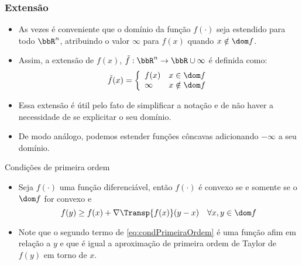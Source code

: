 \begin{frame}
  \frametitle{Extensão}
  \begin{itemize}
    \item As vezes é conveniente que o domínio da função $f(\cdot)$ seja estendido para todo $\bbR^n$, atribuindo o 
    valor $\infty$ para $f(x)$ quando $x \notin \dom f$.
    \item Assim, a extensão de $f(x)$, $\tilde{f}: \bbR^n \rightarrow \bbR \cup \infty$ é definida como:
    \begin{equation}
      \tilde{f}(x) = \left\{\begin{array}{ll}
        f(x) & x \in \dom f \\
        \infty & x \notin \dom f
      \end{array} \right.
    \end{equation}
    \item Essa extensão é útil pelo fato de simplificar a notação e de não haver a necessidade de se explicitar o seu 
    domínio.
    \item De modo análogo, podemos estender funções côncavas adicionando $-\infty$ a seu domínio.
  \end{itemize}
\end{frame}

\begin{frame}{Condições de primeira ordem}
  \begin{itemize}
    \item Seja $f(\cdot)$ uma função diferenciável, então $f(\cdot)$ é convexo se e somente se o $\dom f$ for convexo e 
    \begin{equation}
      f(y) \geq f(x) + \nabla \Transp{f(x)} (y-x) \,\,\,\,\,\, \forall x,y \in \dom f
      \label{eq:condPrimeiraOrdem}
    \end{equation} 
    \item Note que o segundo termo de \eqref{eq:condPrimeiraOrdem} é uma função afim em relação a $y$ e que é igual a 
    aproximação de primeira ordem de Taylor de $f(y)$ em torno de $x$.
    \begin{figure}
      \centering
    \end{figure}
  \end{itemize}
\end{frame}

